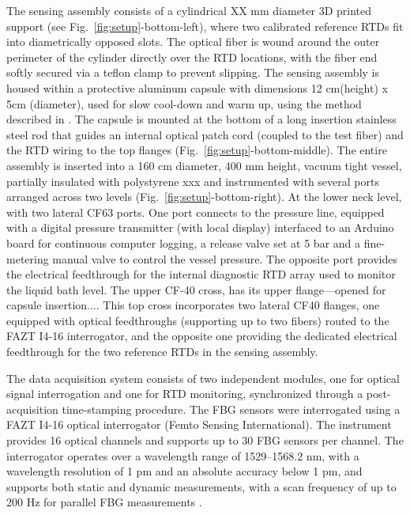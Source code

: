 \documentclass[preprint,11pt]{elsarticle}
\begin{document}
The sensing assembly consists of a cylindrical XX mm diameter 3D printed support (see Fig.~\ref{fig:setup}-bottom-left),  where two calibrated reference RTDs fit into diametrically opposed slots. The optical fiber is wound around the outer perimeter of the cylinder directly over the RTD locations, with the fiber end softly secured via a teflon clamp to prevent slipping. The sensing assembly is housed within a protective aluminum capsule with dimensions 12 cm(height) x 5cm (diameter), used for slow cool-down and warm up, using the method described in \cite{RTDs_paper}. The capsule is mounted at the bottom of a long insertion stainless steel rod that guides an internal optical patch cord (coupled to the test fiber) and the RTD wiring to the top flanges (Fig.~\ref{fig:setup}-bottom-middle). The entire assembly is inserted into a 160 cm diameter, 400 mm height, vacuum tight vessel, partially insulated with polystyrene xxx and instrumented with several ports arranged across two levels (Fig.~\ref{fig:setup}-bottom-right). At the lower neck level, with two lateral CF63 ports. One port connects to the pressure line, equipped with a digital pressure transmitter (with local display) interfaced to an Arduino board for continuous computer logging, a release valve set at 5 bar and a fine-metering manual valve to control the vessel pressure. The opposite port provides the electrical feedthrough for the internal diagnostic RTD array used to monitor the liquid bath level. The upper CF-40 cross, has its upper flange---opened for capsule insertion.... This top cross incorporates two lateral CF40 flanges, one equipped with optical feedthroughs (supporting up to two fibers) routed to the FAZT I4-16 interrogator, and the opposite one providing the dedicated electrical feedthrough for the two reference RTDs in the sensing assembly. 

The data acquisition system consists of two independent modules, one for optical signal interrogation and one for RTD monitoring, synchronized through a post-acquisition time-stamping procedure. The FBG sensors were interrogated using a FAZT I4-16 optical interrogator (Femto Sensing International). The instrument provides 16 optical channels and supports up to 30 FBG sensors per channel. The interrogator operates over a wavelength range of 1529–1568.2 nm, with a wavelength resolution of 1 pm and an absolute accuracy below 1 pm, and supports both static and dynamic measurements, with a scan frequency of up to 200 Hz for parallel FBG measurements \cite{FemtoSenseManual}.
\end{document}
